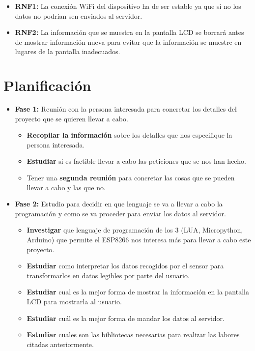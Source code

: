 \begin{itemize}
	\item\textbf{RNF1: } La conexión WiFi del dispositivo ha de ser estable ya que si no los datos no podrían sen enviados al servidor.
	\item\textbf{RNF2: } La información que se muestra en la pantalla LCD se borrará antes de mostrar información nueva para evitar que la información se muestre en lugares de la pantalla inadecuados.
\end{itemize}

\section{Planificación}

\begin{itemize}
	\item\textbf{Fase 1: } Reunión con la persona interesada para concretar los detalles del proyecto que se quieren llevar a cabo.
	\begin{itemize}
		\item\textbf{Recopilar la información}  sobre los detalles que nos especifique la persona interesada.
		\item\textbf{Estudiar}  si es factible llevar a cabo las peticiones que se nos han hecho.
		\item Tener una \textbf{segunda reunión} para concretar las cosas que se pueden llevar a cabo y las que no.
	\end{itemize}
	\item\textbf{Fase 2: } Estudio para decidir en que lenguaje se va a llevar a cabo la programación y como se va proceder para enviar los datos al servidor.
	\begin{itemize}
		\item\textbf{Investigar}  que lenguaje de programación de los 3 (LUA, Micropython, Arduino) que permite el ESP8266 nos interesa más para llevar a cabo este proyecto.
		\item\textbf{Estudiar}  como interpretar los datos recogidos por el sensor para transformarlos en datos legibles por parte del usuario.
		\item\textbf{Estudiar}  cual es la mejor forma de mostrar la información en la pantalla LCD para mostrarla al usuario.
		\item\textbf{Estudiar}  cuál es la mejor forma de mandar los datos al servidor.
		\item\textbf{Estudiar}  cuales son las bibliotecas necesarias para realizar las labores citadas anteriormente.

\end{itemize}
\end{itemize}
